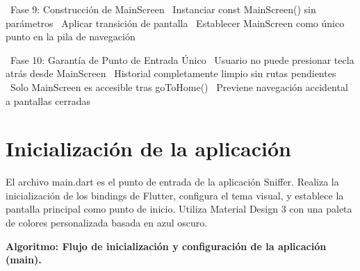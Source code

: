 \begin{algorithmic}[1]
\State~Fase 9: Construcción de MainScreen
\State~Instanciar const MainScreen() sin parámetros %
\State~Aplicar transición de pantalla
\State~Establecer MainScreen como único punto en la pila de navegación

\State~Fase 10: Garantía de Punto de Entrada Único
\State~Usuario no puede presionar tecla atrás desde MainScreen
\State~Historial completamente limpio sin rutas pendientes
\State~Solo MainScreen es accesible tras goToHome() %
\State~Previene navegación accidental a pantallas cerradas

\end{algorithmic}

\section{Inicialización de la aplicación}

El archivo main.dart es el punto de entrada de la aplicación Sniffer. Realiza la inicialización de los bindings de Flutter, configura el tema visual, y establece la pantalla principal como punto de inicio. Utiliza Material Design 3 con una paleta de colores personalizada basada en azul oscuro.
\par

\noindent\textbf{Algoritmo: Flujo de inicialización y configuración de la aplicación (main).}

